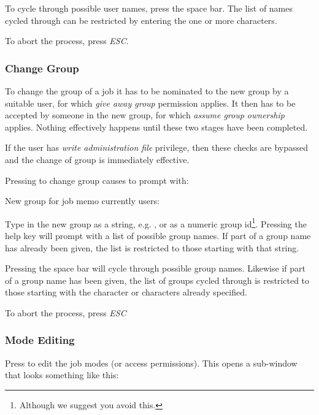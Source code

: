 To cycle through possible user names, press the space bar. The list of
names cycled through can be restricted by entering the one or more
characters.

To abort the process, press \textit{ESC}.

\subsubsection{Change Group}
To change the group of a job it has to be nominated to the new group by
a suitable user, for which \textit{give away group }permission applies.
It then has to be accepted by someone in the new group, for which
\textit{assume group ownership }applies. Nothing effectively happens
until these two stages have been completed.

If the user has \textit{write administration file} privilege, then these
checks are bypassed and the change of group is immediately effective.

Pressing  to change group causes \PrBtq{} to prompt
with:

\begin{expara}

New group for job {\textquotesingle}memo{\textquotesingle} currently
users:

\end{expara}

Type in the new group as a string, e.g. , or as
a numeric group id\footnote{Although we suggest you avoid this.}.
Pressing the help key will prompt with a list of possible group names.
If part of a group name has already been given, the list is restricted
to those starting with that string.

Pressing the space bar will cycle through possible group names. Likewise
if part of a group name has been given, the list of groups cycled
through is restricted to those starting with the character or
characters already specified.

To abort the process, press \textit{ESC}

\subsubsection{Mode Editing}
Press  to edit the job modes (or access
permissions). This opens a sub-window that looks something like this:

